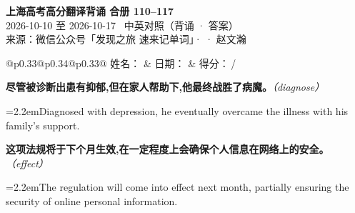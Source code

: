 \documentclass[11pt,a4paper]{article}
\newcommand{\num}[1]{\makebox[1.9em][r]{#1.}\hspace{0.3em}}
\newcommand{\prompt}[1]{\emph{\textcolor{tipblue}{\small（#1）}}}
\begin{document}
\pagestyle{plain}
\begin{center}
{\LARGE\bfseries 上海高考高分翻译背诵 \quad 合册 110–117}\\[0.25em]
{\large 2026-10-10 至 2026-10-17 \quad\ 中英对照（背诵 · 答案）}\\[0.35em]
{\footnotesize 来源：微信公众号「发现之旅 速来记单词」·  · 赵文瀚}
\end{center}

\vspace{0.4em}
\noindent\begin{tabular}{@{}p{0.33\textwidth}@{}p{0.34\textwidth}@{}p{0.33\textwidth}@{}}
姓名：\underline{\hspace{2.0cm}} & 日期：\underline{\hspace{2.0cm}} & 得分：\underline{\hspace{1.4cm}}\,/ \\
\end{tabular}

\vspace{0.5em}

\vspace{0.8em}
\vspace{0.35em}\vspace{0.15em}

\begin{minipage}{\linewidth}

\num{1}\textbf{尽管被诊断出患有抑郁,但在家人帮助下,他最终战胜了病魔。}\prompt{diagnose}

\vspace{0.15em}

\noindent\hangindent=2.2em\hspace{2.2em}Diagnosed with depression, he eventually overcame the illness with his family’s support.

\end{minipage}

\begin{minipage}{\linewidth}

\num{2}\textbf{这项法规将于下个月生效,在一定程度上会确保个人信息在网络上的安全。}\prompt{effect}

\vspace{0.15em}

\noindent\hangindent=2.2em\hspace{2.2em}The regulation will come into effect next month, partially ensuring the security of online personal information.

\end{minipage}
\end{document}
